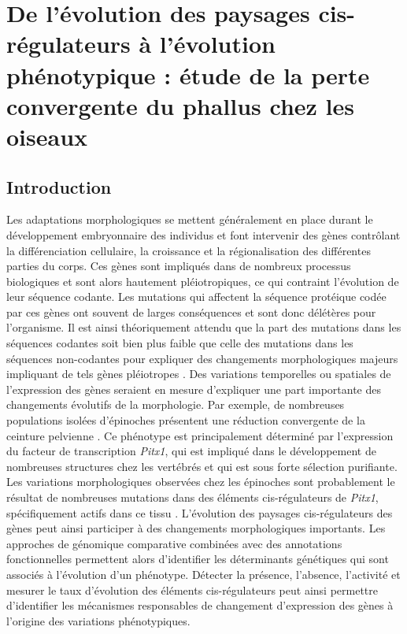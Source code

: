 \chapter{De l’évolution des paysages \acrshort{cis}-régulateurs à l’évolution phénotypique : étude de la perte convergente du phallus chez les oiseaux}
{\hypersetup{linkcolor=GREYDARK}\minitoc}
\label{chap:4-evolpheno}

\section{Introduction}

Les adaptations morphologiques se mettent généralement en place durant le développement embryonnaire des individus et font intervenir des gènes contrôlant la différenciation cellulaire, la croissance et la régionalisation des différentes parties du corps. Ces gènes sont impliqués dans de nombreux processus biologiques et sont alors hautement pléiotropiques, ce qui contraint l’évolution de leur séquence codante. Les mutations qui affectent la séquence protéique codée par ces gènes ont souvent de larges conséquences et sont donc délétères pour l’organisme. Il est ainsi théoriquement attendu que la part des mutations dans les séquences codantes soit bien plus faible que celle des mutations dans les séquences non-codantes pour expliquer des changements morphologiques majeurs impliquant de tels gènes pléiotropes \citep{wray_evolutionary_2007, carroll_evo-devo_2008}. Des variations temporelles ou spatiales de l’expression des gènes seraient en mesure d’expliquer une part importante des changements évolutifs de la morphologie. Par exemple, de nombreuses populations isolées d’épinoches présentent une réduction convergente de la ceinture pelvienne \citep{shapiro_genetic_2004}. Ce phénotype est principalement déterminé par l’expression du facteur de transcription \textit{Pitx1}, qui est impliqué dans le développement de nombreuses structures chez les vertébrés et qui est sous forte sélection purifiante. Les variations morphologiques observées chez les épinoches sont probablement le résultat de nombreuses mutations dans des éléments \acrshort{cis}-régulateurs de \textit{Pitx1}, spécifiquement actifs dans ce tissu \citep{chan_adaptive_2010, thompson_novel_2018}. L’évolution des paysages \acrshort{cis}-régulateurs des gènes peut ainsi participer à des changements morphologiques importants. Les approches de génomique comparative combinées avec des annotations fonctionnelles permettent alors d’identifier les déterminants génétiques qui sont associés à l’évolution d’un phénotype. Détecter la présence, l’absence, l’activité et mesurer le taux d’évolution des éléments \acrshort{cis}-régulateurs peut ainsi permettre d’identifier les mécanismes responsables de changement d’expression des gènes à l’origine des variations phénotypiques. \\

